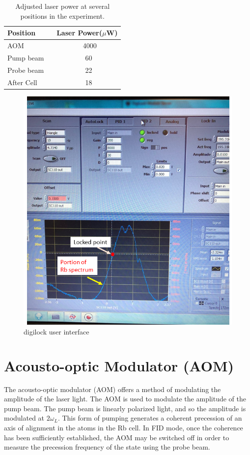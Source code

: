 \begin{table}[h]
\centering
\begin{tabular}{|l | l|}
\hline

\textbf{ Position}    & \textbf{Laser Power($\mu$W)} \\
\hline

AOM ~&  ~ ~ ~ ~ ~4000  \\

Pump beam ~  &  ~ ~ ~ ~ ~ 60  \\

Probe beam ~  &  ~ ~ ~ ~ ~ 22  \\
After Cell ~ &  ~ ~ ~ ~ ~ 18   \\

\hline
\end{tabular}
\caption{Adjusted laser power at several positions in the experiment.\label{table:laser power}}
\end{table}
\begin{figure}[h]
\centering
\includegraphics[width=0.7\linewidth]{figures/digilock.png}
\caption{digilock user interface\label{fig:digilock}}
\end{figure}
\section{Acousto-optic Modulator (AOM)\label{sec:AOM}}

The acousto-optic modulator (AOM) offers a method of modulating the
amplitude of the laser light.
The AOM is used to modulate the amplitude of the pump beam. The pump beam is linearly polarized light, and so the amplitude
  is modulated at $2\omega_L$. This form of pumping generates a coherent precession of an axis of alignment in the atoms in the Rb cell. In FID mode, once the coherence has been sufficiently established, the AOM may be switched off in order to measure the precession frequency of the state using the probe beam.


